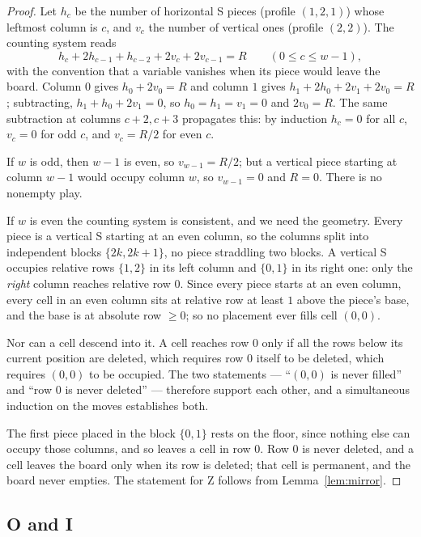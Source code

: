 \documentclass[11pt,a4paper]{article}
\theoremstyle{plain}
\theoremstyle{definition}
\theoremstyle{remark}
\begin{document}
\begin{proof}
Let $h_c$ be the number of horizontal S pieces (profile $(1,2,1)$) whose leftmost
column is $c$, and $v_c$ the number of vertical ones (profile $(2,2)$). The counting
system reads
\[
h_c + 2h_{c-1} + h_{c-2} + 2v_c + 2v_{c-1} = R \qquad (0 \le c \le w-1),
\]
with the convention that a variable vanishes when its piece would leave the board.
Column $0$ gives $h_0 + 2v_0 = R$ and column $1$ gives $h_1 + 2h_0 + 2v_1 + 2v_0 =
R$; subtracting, $h_1 + h_0 + 2v_1 = 0$, so $h_0 = h_1 = v_1 = 0$ and $2v_0 = R$. The
same subtraction at columns $c+2, c+3$ propagates this: by induction $h_c = 0$ for
all $c$, $v_c = 0$ for odd $c$, and $v_c = R/2$ for even $c$.

If $w$ is odd, then $w-1$ is even, so $v_{w-1} = R/2$; but a vertical piece starting
at column $w-1$ would occupy column $w$, so $v_{w-1} = 0$ and $R = 0$. There is no
nonempty play.

If $w$ is even the counting system is consistent, and we need the geometry. Every
piece is a vertical S starting at an even column, so the columns split into
independent blocks $\{2k, 2k+1\}$, no piece straddling two blocks. A vertical S
occupies relative rows $\{1,2\}$ in its left column and $\{0,1\}$ in its right one:
only the \emph{right} column reaches relative row $0$. Since every piece starts at an
even column, every cell in an even column sits at relative row at least $1$ above the
piece's base, and the base is at absolute row $\geq 0$; so no placement ever fills
cell $(0,0)$.

Nor can a cell descend into it. A cell reaches row $0$ only if all the rows below its
current position are deleted, which requires row $0$ itself to be deleted, which
requires $(0,0)$ to be occupied. The two statements --- ``$(0,0)$ is never filled''
and ``row $0$ is never deleted'' --- therefore support each other, and a simultaneous
induction on the moves establishes both.

The first piece placed in the block $\{0,1\}$ rests on the floor, since nothing else
can occupy those columns, and so leaves a cell in row $0$. Row $0$ is never deleted,
and a cell leaves the board only when its row is deleted; that cell is permanent, and
the board never empties. The statement for Z follows from Lemma~\ref{lem:mirror}.
\end{proof}

\subsection{O and I}
\end{document}
